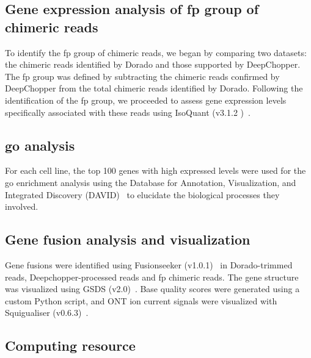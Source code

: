\documentclass[pdflatex, sn-mathphys-num, lineno]{sn-jnl}%
\theoremstyle{thmstyleone}%
\theoremstyle{thmstyletwo}%
\theoremstyle{thmstylethree}%
\begin{document}


\subsection{Gene expression analysis of \gls{fp} group of chimeric reads}

To identify the \gls{fp} group of chimeric reads, we began by comparing two datasets: the chimeric reads identified by Dorado and those supported by DeepChopper.
The \gls{fp} group was defined by subtracting the chimeric reads confirmed by DeepChopper from the total chimeric reads identified by Dorado.
Following the identification of the \gls{fp} group, we proceeded to assess gene expression levels specifically associated with these reads using IsoQuant (v3.1.2 )~\cite{prjibelski2023accurate}.


\subsection{\gls{go} analysis}

For each cell line, the top 100 genes with high expressed levels were used for the \gls{go} enrichment analysis using the Database for Annotation, Visualization, and Integrated Discovery (DAVID)~\cite{sherman2022david} to elucidate the biological processes they involved.

\subsection{Gene fusion analysis and visualization}

Gene fusions were identified using Fusionseeker (v1.0.1)~\cite{chen2023gene} in Dorado-trimmed reads, Deepchopper-processed reads and \gls{fp} chimeric reads.
The gene structure was visualized using GSDS (v2.0)~\cite{hu2015gsds}.
Base quality scores were generated using a custom Python script, and ONT ion current signals were visualized with Squigualiser (v0.6.3)~\cite{samarakoon2024interactive}.


\subsection{Computing resource}
\end{document}

